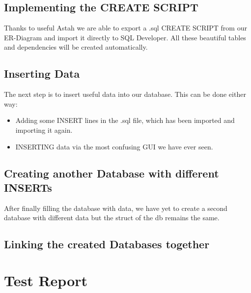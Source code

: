 \documentclass[11pt,a4paper]{article}
\begin{document}
\subsection{Implementing the CREATE SCRIPT}
Thanks to useful Astah we are able to export a .sql CREATE SCRIPT from our ER-Diagram and import it directly to SQL Developer. All these beautiful tables and dependencies will be created automatically.
\subsection{Inserting Data}
The next step is to insert useful data into our database. This can be done either way:
\begin{itemize}
	\item Adding some INSERT lines in the .sql file, which has been imported and importing it again.
	\item INSERTING data via the most confusing GUI we have ever seen.
\end{itemize}
\subsection{Creating another Database with different INSERTs}
After finally filling the database with data, we have yet to create a second database with different data but the struct of the db remains the same.
\subsection{Linking the created Databases together}
\newpage

\section{Test Report}
\newpage



\end{document}

